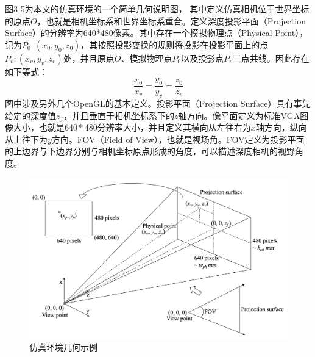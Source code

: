 图3-5为本文的仿真环境的一个简单几何说明图，
其中定义仿真相机位于世界坐标的原点$O$，也就是相机坐标系和世界坐标系重合。定义深度投影平面（Projection Surface）的分辨率为640*480像素。其中存在一个模拟物理点（Physical Point），记为$P_0:(x_0,y_0,z_0)$，其按照投影变换的规则将投影在投影平面上的点$P_v:(x_v,y_v,z_v)$处，并且原点$O$、模拟物理点$P_0$以及投影点$P_v$三点共线。因此存在如下等式：
\begin{equation}
	\frac{x_0}{x_v}=\frac{y_0}{y_v}=\frac{z_0}{z_v}
\end{equation}
图中涉及另外几个OpenGL的基本定义。投影平面（Projection Surface）具有事先给定的深度值$z_f$，并且垂直于相机坐标系下的$z$轴方向。像平面定义为标准VGA图像大小，也就是$640*480$分辨率大小，并且定义其横向从左往右为$x$轴方向，纵向从上往下为$y$方向。FOV（Field of View），也就是视场角。FOV定义为投影平面的上边界与下边界分别与相机坐标原点形成的角度，可以描述深度相机的视野角度。
\begin{figure}[htb]
	\centering 
	\includegraphics[width=\textwidth]{./mypic/projection.jpg} 
	\caption{仿真环境几何示例} 
\end{figure}

